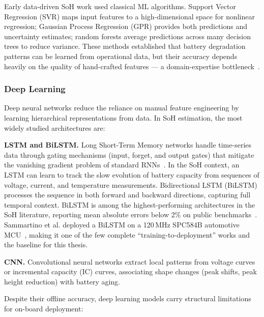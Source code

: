 Early data-driven SoH work used classical ML algorithms. Support Vector Regression (SVR) maps input features to a high-dimensional space for nonlinear regression; Gaussian Process Regression (GPR) provides both predictions and uncertainty estimates; random forests average predictions across many decision trees to reduce variance. These methods established that battery degradation patterns can be learned from operational data, but their accuracy depends heavily on the quality of hand-crafted features --- a domain-expertise bottleneck~\autocite{Nozarijouybari2024}.

\subsubsection*{Deep Learning}

Deep neural networks reduce the reliance on manual feature engineering by learning hierarchical representations from data. In SoH estimation, the most widely studied architectures are:

\textbf{LSTM and BiLSTM.} Long Short-Term Memory networks handle time-series data through gating mechanisms (input, forget, and output gates) that mitigate the vanishing gradient problem of standard RNNs~\autocite{hochreiter1997}. In the SoH context, an LSTM can learn to track the slow evolution of battery capacity from sequences of voltage, current, and temperature measurements. Bidirectional LSTM (BiLSTM) processes the sequence in both forward and backward directions, capturing full temporal context. BiLSTM is among the highest-performing architectures in the SoH literature, reporting mean absolute errors below 2\% on public benchmarks~\autocite{Nozarijouybari2024}. Sammartino et al. deployed a BiLSTM on a 120\,MHz SPC584B automotive MCU~\autocite{Sammartino2021}, making it one of the few complete ``training-to-deployment'' works and the baseline for this thesis.

\textbf{CNN.} Convolutional neural networks extract local patterns from voltage curves or incremental capacity (IC) curves, associating shape changes (peak shifts, peak height reduction) with battery aging.

Despite their offline accuracy, deep learning models carry structural limitations for on-board deployment:

